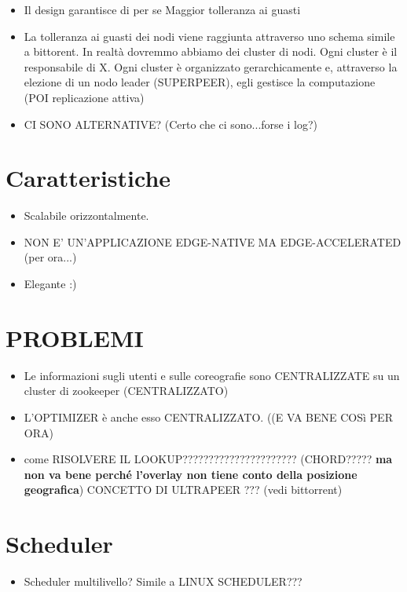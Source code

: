 \documentclass[10pt,a4paper]{article}
\begin{document}
\begin{itemize}
\item Il design garantisce di per se Maggior tolleranza ai guasti

\item La tolleranza ai guasti dei nodi viene raggiunta attraverso uno schema simile a bittorent. In realtà dovremmo abbiamo dei cluster di nodi. Ogni cluster è il responsabile di X. Ogni cluster è organizzato gerarchicamente e, attraverso la elezione di un nodo leader (SUPERPEER), egli gestisce la computazione (POI replicazione attiva)

\item CI SONO ALTERNATIVE? (Certo che ci sono...forse i log?)
\end{itemize}


\section{Caratteristiche}

\begin{itemize}
\item Scalabile orizzontalmente.

\item NON E' UN'APPLICAZIONE EDGE-NATIVE MA EDGE-ACCELERATED (per ora...)

\item Elegante :) 

\end{itemize}

\section{PROBLEMI}


\begin{itemize}
\item Le informazioni sugli utenti e sulle coreografie sono CENTRALIZZATE su un cluster di zookeeper (CENTRALIZZATO)

\item L'OPTIMIZER è anche esso CENTRALIZZATO. ((E VA BENE COSì PER ORA)

\item come RISOLVERE IL LOOKUP?????????????????????? (CHORD????? \textbf{ma non va bene perché l'overlay non tiene conto della posizione geografica})  CONCETTO DI ULTRAPEER ??? (vedi bittorrent)


\end{itemize}
\section{Scheduler}
\begin{itemize}
\item Scheduler multilivello? Simile a LINUX SCHEDULER???

\end{itemize}
\end{document}
